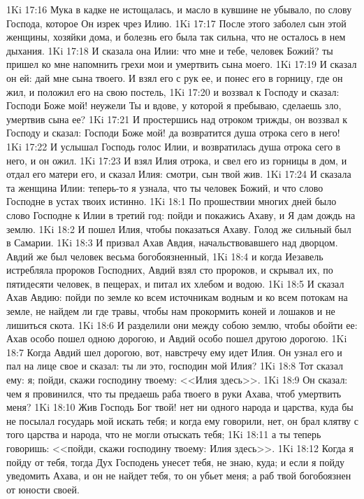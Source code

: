 \vs 1Ki 17:16 Мука в кадке не истощалась, и масло в кувшине не убывало, по слову Господа, которое Он изрек чрез Илию.
\vs 1Ki 17:17 После этого заболел сын этой женщины, хозяйки дома, и болезнь его была так сильна, что не осталось в нем дыхания.
\vs 1Ki 17:18 И сказала она Илии: что мне и тебе, человек Божий? ты пришел ко мне напомнить грехи мои и умертвить сына моего.
\vs 1Ki 17:19 И сказал он ей: дай мне сына твоего. И взял его с рук ее, и понес его в горницу, где он жил, и положил его на свою постель,
\vs 1Ki 17:20 и воззвал к Господу и сказал: Господи Боже мой! неужели Ты и вдове, у которой я пребываю, сделаешь зло, умертвив сына ее?
\vs 1Ki 17:21 И простершись над отроком трижды, он воззвал к Господу и сказал: Господи Боже мой! да возвратится душа отрока сего в него!
\vs 1Ki 17:22 И услышал Господь голос Илии, и возвратилась душа отрока сего в него, и он ожил.
\vs 1Ki 17:23 И взял Илия отрока, и свел его из горницы в дом, и отдал его матери его, и сказал Илия: смотри, сын твой жив.
\vs 1Ki 17:24 И сказала та женщина Илии: теперь-то я узнала, что ты человек Божий, и что слово Господне в устах твоих истинно.
\vs 1Ki 18:1 По прошествии многих дней было слово Господне к Илии в третий год: пойди и покажись Ахаву, и Я дам дождь на землю.
\vs 1Ki 18:2 И пошел Илия, чтобы показаться Ахаву. Голод же сильный был в Самарии.
\vs 1Ki 18:3 И призвал Ахав Авдия, начальствовавшего над дворцом. Авдий же был человек весьма богобоязненный,
\vs 1Ki 18:4 и когда Иезавель истребляла пророков Господних, Авдий взял сто пророков, и скрывал их, по пятидесяти человек, в пещерах, и питал их хлебом и водою.
\vs 1Ki 18:5 И сказал Ахав Авдию: пойди по земле ко всем источникам водным и ко всем потокам на земле, не найдем ли где травы, чтобы нам прокормить коней и лошаков и не лишиться скота.
\vs 1Ki 18:6 И разделили они между собою землю, чтобы обойти ее: Ахав особо пошел одною дорогою, и Авдий особо пошел другою дорогою.
\rsbpar\vs 1Ki 18:7 Когда Авдий шел дорогою, вот, навстречу ему идет Илия. Он узнал его и пал на лице свое и сказал: ты ли это, господин мой Илия?
\vs 1Ki 18:8 Тот сказал ему: я; пойди, скажи господину твоему: <<Илия здесь>>.
\vs 1Ki 18:9 Он сказал: чем я провинился, что ты предаешь раба твоего в руки Ахава, чтоб умертвить меня?
\vs 1Ki 18:10 Жив Господь Бог твой! нет ни одного народа и царства, куда бы не посылал государь мой искать тебя; и когда ему говорили,  нет, он брал клятву с того царства и народа, что не могли отыскать тебя;
\vs 1Ki 18:11 а ты теперь говоришь: <<пойди, скажи господину твоему: Илия здесь>>.
\vs 1Ki 18:12 Когда я пойду от тебя, тогда Дух Господень унесет тебя, не знаю, куда; и если я пойду уведомить Ахава, и он не найдет тебя, то он убьет меня; а раб твой богобоязнен от юности своей.

